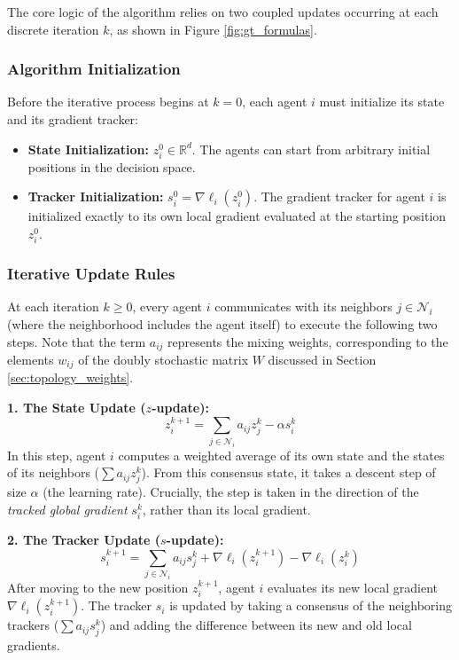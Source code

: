 \documentclass[11pt, a4paper]{article}
\begin{document}
The core logic of the algorithm relies on two coupled updates occurring at each discrete iteration $k$, as shown in Figure \ref{fig:gt_formulas}.

\subsubsection*{Algorithm Initialization}
Before the iterative process begins at $k=0$, each agent $i$ must initialize its state and its gradient tracker:
\begin{itemize}
    \item \textbf{State Initialization:} $z_i^0 \in \mathbb{R}^d$. The agents can start from arbitrary initial positions in the decision space.
    \item \textbf{Tracker Initialization:} $s_i^0 = \nabla \ell_i(z_i^0)$. The gradient tracker for agent $i$ is initialized exactly to its own local gradient evaluated at the starting position $z_i^0$.
\end{itemize}

\subsubsection*{Iterative Update Rules}
At each iteration $k \geq 0$, every agent $i$ communicates with its neighbors $j \in \mathcal{N}_i$ (where the neighborhood includes the agent itself) to execute the following two steps. Note that the term $a_{ij}$ represents the mixing weights, corresponding to the elements $w_{ij}$ of the doubly stochastic matrix $W$ discussed in Section \ref{sec:topology_weights}.

\textbf{1. The State Update ($z$-update):}
\begin{equation}
    z_i^{k+1} = \sum_{j \in \mathcal{N}_i} a_{ij} z_j^k - \alpha s_i^k
    \label{eq:z_update}
\end{equation}
In this step, agent $i$ computes a weighted average of its own state and the states of its neighbors ($\sum a_{ij} z_j^k$). From this consensus state, it takes a descent step of size $\alpha$ (the learning rate). Crucially, the step is taken in the direction of the \textit{tracked global gradient} $s_i^k$, rather than its local gradient.

\textbf{2. The Tracker Update ($s$-update):}
\begin{equation}
    s_i^{k+1} = \sum_{j \in \mathcal{N}_i} a_{ij} s_j^k + \nabla \ell_i(z_i^{k+1}) - \nabla \ell_i(z_i^k)
    \label{eq:s_update}
\end{equation}
After moving to the new position $z_i^{k+1}$, agent $i$ evaluates its new local gradient $\nabla \ell_i(z_i^{k+1})$. The tracker $s_i$ is updated by taking a consensus of the neighboring trackers ($\sum a_{ij} s_j^k$) and adding the difference between its new and old local gradients. 
\end{document}
